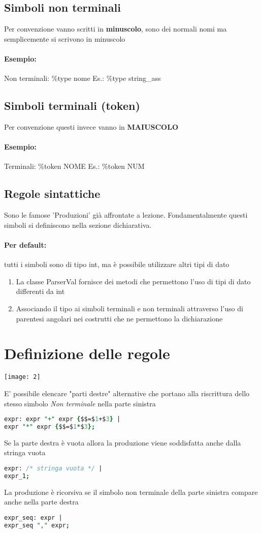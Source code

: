 \documentclass[12pt, a4paper, openany, twoside]{book}
\begin{document}
\subsection{Simboli non terminali}
Per convenzione vanno scritti in \textbf{minuscolo}, sono dei normali nomi ma
semplicemente
si scrivono in minuscolo
\paragraph{Esempio: }Non terminali: \%type nome Es.: \%type string\_ass
\subsection{Simboli terminali (token)}
Per convenzione questi invece vanno in \textbf{MAIUSCOLO}
\paragraph{Esempio: }Terminali: \%token NOME Es.: \%token NUM
\subsection{Regole sintattiche}
Sono le famose 'Produzioni' già affrontate a lezione.
Fondamentalmente questi simboli si definiscono nella sezione dichiarativa. 
\paragraph{Per default: }tutti i simboli sono di tipo int, ma è possibile
utilizzare altri tipi di dato
\begin{enumerate}
	\item La classe ParserVal fornisce dei metodi che permettono l’uso di tipi 
	di dato differenti da int
	\item Associando il tipo ai simboli terminali e non terminali attraverso
	l’uso di parentesi angolari nei costrutti che ne permettono la dichiarazione
\end{enumerate}
\section{Definizione delle regole}
\begin{center}
\texttt{[image: 2]}
\end{center}
E' possibile elencare "parti destre" alternative che portano alla riscrittura
dello stesso simbolo \textit{Non terminale} nella parte sinistra
\begin{lstlisting}[language=Prolog]
expr: expr "+" expr {$$=$1+$3} |
expr "*" expr {$$=$1*$3};
\end{lstlisting}
Se la parte destra è vuota allora la produzione viene soddisfatta anche dalla
stringa vuota
\begin{lstlisting}[language=Prolog]
expr: /* stringa vuota */ |
expr_1;
\end{lstlisting}
La produzione è ricorsiva se il simbolo non terminale della parte sinistra
compare anche nella parte destra
\begin{lstlisting}[language=Prolog]
expr_seq: expr |
expr_seq "," expr;
\end{lstlisting}
\end{document}
